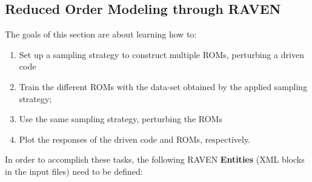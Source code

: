 \subsection{Reduced Order Modeling through RAVEN}
\label{subsub:ROMraven}
The goals of this section are about learning how to:
 \begin{enumerate}
   \item Set up a sampling strategy to construct multiple ROMs, perturbing a driven code
   \item Train the different ROMs with the data-set obtained by the applied sampling strategy;
   \item Use the same sampling strategy, perturbing the ROMs
   \item Plot the responses of the driven code and ROMs, respectively.
\end{enumerate}
In order to accomplish these tasks, the following RAVEN \textbf{Entities} (XML blocks in the input files) need to be defined:
